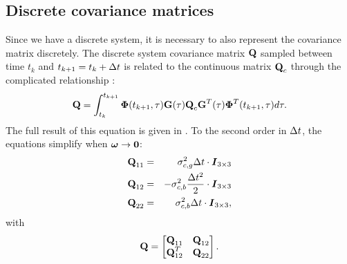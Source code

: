 \subsection{Discrete covariance matrices}
Since we have a discrete system, it is necessary to also represent the covariance matrix discretely. The discrete system covariance matrix $\textrm{\textbf{Q}}$ sampled between time $t_k$ and $t_{k+1} =t_{k}+\Delta t$ is related to the continuous matrix $\textrm{\textbf{Q}}_c$ through the complicated relationship \citep{Maybeck:1982vh}:
$$
\displaystyle\textrm{\textbf{Q}} = \int^{t_{k+1}}_{t_k} \boldsymbol{\Phi}(t_{k+1},\tau)\textrm{\textbf{G}}(\tau)\textrm{\textbf{Q}}_c\textrm{\textbf{G}}^T(\tau)\boldsymbol{\Phi}^T(t_{k+1},\tau)d\tau.
$$
The full result of this equation is given in \citep{Trawny:2005va}. To the second order in $\Delta t$, the equations simplify when $\boldsymbol\omega\to \boldsymbol{0}$:
\begin{eqnarray}
\textrm{\textbf{Q}}_{11} &=& \sigma_{c,g}^2\Delta t\cdot\boldsymbol{I}_{3\times 3}\\
\textrm{\textbf{Q}}_{12} &=& -\sigma_{c,b}^2\frac{\Delta t^2}{2}\cdot\boldsymbol{I}_{3\times 3}\\
\textrm{\textbf{Q}}_{22} &=& \sigma_{c,b}^2\Delta t\cdot\boldsymbol{I}_{3\times 3},
\end{eqnarray}
with 
\begin{equation}
\textrm{\textbf{Q}} = \begin{bmatrix} \textrm{\textbf{Q}}_{11} & \textrm{\textbf{Q}}_{12} \\ \textrm{\textbf{Q}}_{12}^T & \textrm{\textbf{Q}}_{22}\end{bmatrix}.
\end{equation}
